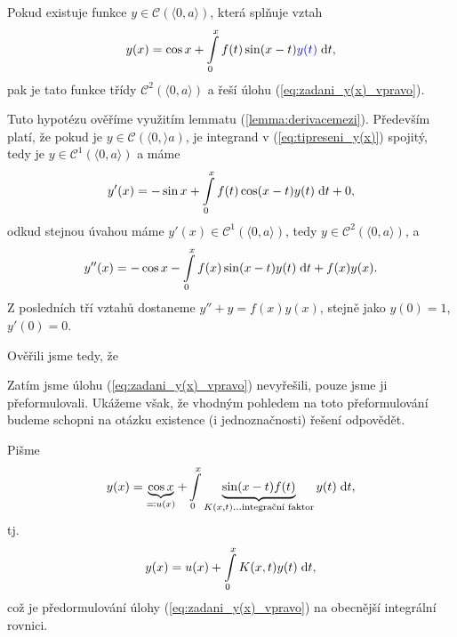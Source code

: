 Pokud existuje funkce $y\in\mathcal{C}(\langle 0,a\rangle)$, která splňuje vztah
\begin{equation}
    y(x) = \cos x + \int\limits_0^x f(t)\sin(x-t)\textcolor{blue}{y(t)}\;\mathrm{d}t,
    \label{eq:tipreseni_y(x)}
\end{equation}
pak je tato funkce třídy $\mathcal{C}^2(\langle0,a\rangle)$ a řeší úlohu (\ref{eq:zadani_y(x)_vpravo}).

Tuto hypotézu ověříme využitím lemmatu (\ref{lemma:derivacemezi}). Především platí, že pokud je $y\in \mathcal{C}(\langle 0,\rangle a)$, je integrand v (\ref{eq:tipreseni_y(x)}) spojitý, tedy je $y\in\mathcal{C}^1(\langle 0,a\rangle )$ a máme
\begin{equation}
    y'(x) = -\sin x + \int\limits_0^x f(t)\cos(x-t)y(t)\;\mathrm{d}t + 0,
\end{equation}
odkud stejnou úvahou máme $y'(x)\in\mathcal{C}^1(\langle 0,a\rangle)$, tedy $y\in\mathcal{C}^2(\langle 0,a\rangle )$, a 
\begin{equation}
    y''(x) = -\cos x -\int\limits_0^x f(x) \sin(x-t)y(t)\;\mathrm{d}t + f(x)y(x).
\end{equation}
Z posledních tří vztahů dostaneme $y''+y=f(x)y(x)$, stejně jako $y(0)=1$, $y'(0)=0$.

Ověřili jsme tedy, že
\begin{figure}[h!]
    \centering
\end{figure}
Zatím jsme úlohu (\ref{eq:zadani_y(x)_vpravo}) nevyřešili, pouze jsme ji přeformulovali. Ukážeme však, že vhodným pohledem na toto přeformulování budeme schopni na otázku existence (i jednoznačnosti) řešení odpovědět.

Pišme 
\begin{equation}
    y(x)=\underbrace{\cos x}_{\eqqcolon u(x)} + \int\limits_0^x \underbrace{\sin(x-t)f(t)}_{K(x,t)\hdots \text{integrační faktor}} y(t) \;\mathrm{d}t ,
\end{equation}
tj. 
\begin{equation}
    y(x) = u(x) + \int\limits_0^xK(x,t)y(t)\;\mathrm{d}t,
    \label{eq:zadani_preformulovano}
\end{equation}
což je předormulování úlohy (\ref{eq:zadani_y(x)_vpravo}) na obecnější integrální rovnici.

